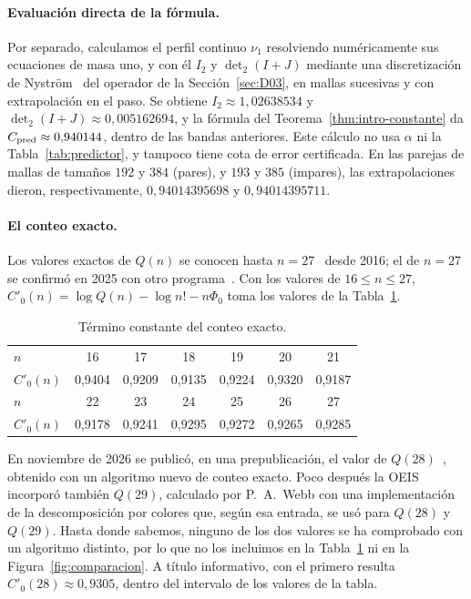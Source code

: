 \paragraph{Evaluación directa de la fórmula.}
Por separado, calculamos el perfil continuo $\nu_1$ resolviendo numéricamente sus ecuaciones de masa uno, y
con él $I_2$ y $\det_2(I+J)$ mediante una discretización de Nyström~\cite{Bornemann} del operador de la
Sección~\ref{sec:D03}, en mallas sucesivas y con extrapolación en el paso. Se obtiene
$I_2\approx1{,}02638534$ y $\det_2(I+J)\approx0{,}005162694$, y la fórmula del
Teorema~\ref{thm:intro-constante} da $C_{\rm pred}\approx0{,}940144$, dentro de las bandas anteriores. Este
cálculo no usa $\alpha$ ni la Tabla~\ref{tab:predictor}, y tampoco tiene cota de error certificada.
En las parejas de mallas de tamaños $192$ y $384$ (pares), y $193$ y $385$ (impares), las extrapolaciones
dieron, respectivamente, $0{,}94014395698$ y $0{,}94014395711$.

\paragraph{El conteo exacto.}
Los valores exactos de $Q(n)$ se conocen hasta $n=27$~\cite{OEIS,PE} desde 2016; el de $n=27$ se
confirmó en 2025 con otro programa~\cite{YaoLi}. Con los valores de
$16\le n\le27$, $C'_0(n)=\log Q(n)-\log n!-n\Phi_0$ toma los valores de la Tabla~\ref{tab:exacto}.

\begin{table}[ht]
\centering
\begin{tabular}{lcccccc}
\toprule
$n$ & 16 & 17 & 18 & 19 & 20 & 21\\
$C'_0(n)$ & 0,9404 & 0,9209 & 0,9135 & 0,9224 & 0,9320 & 0,9187\\
\midrule
$n$ & 22 & 23 & 24 & 25 & 26 & 27\\
$C'_0(n)$ & 0,9178 & 0,9241 & 0,9295 & 0,9272 & 0,9265 & 0,9285\\
\bottomrule
\end{tabular}
\caption{Término constante del conteo exacto.}\label{tab:exacto}
\end{table}

En noviembre de 2026 se publicó, en una prepublicación, el valor de $Q(28)$~\cite{Cherepanov},
obtenido con un algoritmo nuevo de conteo exacto. Poco después la OEIS~\cite{OEIS} incorporó también
$Q(29)$, calculado por P.~A.~Webb con una implementación de la descomposición por colores que, según
esa entrada, se usó para $Q(28)$ y $Q(29)$. Hasta donde sabemos, ninguno de los dos valores se ha
comprobado con un algoritmo distinto, por lo que no los incluimos en la Tabla~\ref{tab:exacto} ni en
la Figura~\ref{fig:comparacion}. A título informativo, con el primero resulta
$C'_0(28)\approx0{,}9305$, dentro del intervalo de los valores de la tabla.

